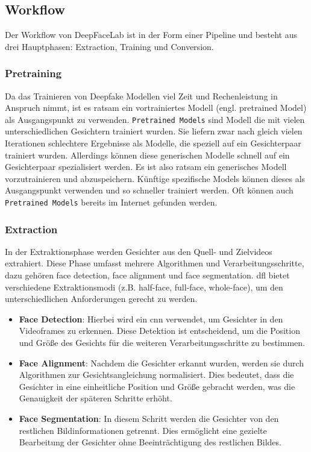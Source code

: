 \subsection{Workflow}\label{subsec:workflow}
Der Workflow von DeepFaceLab ist in der Form einer Pipeline und besteht aus drei Hauptphasen: Extraction, Training und Conversion.

\subsubsection*{Pretraining}\label{subsubsec:pretraining}
Da das Trainieren von Deepfake Modellen viel Zeit und Rechenleistung in Anspruch nimmt, ist es ratsam ein vortrainiertes Modell (engl. pretrained Model) als Ausgangspunkt zu verwenden.
\texttt{Pretrained Models} sind Modell die mit vielen unterschiedlichen Gesichtern trainiert wurden.
Sie liefern zwar nach gleich vielen Iterationen schlechtere Ergebnisse als Modelle, die speziell auf ein Gesichterpaar trainiert wurden.
Allerdings können diese generischen Modelle schnell auf ein Gesichterpaar spezialisiert werden.
Es ist also ratsam ein generisches Modell vorzutrainieren und abzuspeichern.
Künftige spezifische Models können dieses als Ausgangspunkt verwenden und so schneller trainiert werden.
Oft können auch \texttt{Pretrained Models} bereits im Internet gefunden werden.

\subsubsection*{Extraction}
In der Extraktionsphase werden Gesichter aus den Quell- und Zielvideos extrahiert.
Diese Phase umfasst mehrere Algorithmen und Verarbeitungsschritte, dazu gehören face detection, face alignment und face segmentation.
\gls{dfl} bietet verschiedene Extraktionsmodi (z.B. half-face, full-face, whole-face), um den unterschiedlichen Anforderungen gerecht zu werden\cite{deepfacelabintegratedflexibleextensible, deepfacelab}.

\begin{itemize}
    \item \textbf{Face Detection}: Hierbei wird ein \gls{cnn} verwendet, um Gesichter in den Videoframes zu erkennen.
    Diese Detektion ist entscheidend, um die Position und Größe des Gesichts für die weiteren Verarbeitungsschritte zu bestimmen.
    \item \textbf{Face Alignment}: Nachdem die Gesichter erkannt wurden, werden sie durch Algorithmen zur Gesichtsangleichung normalisiert.
    Dies bedeutet, dass die Gesichter in eine einheitliche Position und Größe gebracht werden, was die Genauigkeit der späteren Schritte erhöht.
    \item \textbf{Face Segmentation}: In diesem Schritt werden die Gesichter von den restlichen Bildinformationen getrennt.
    Dies ermöglicht eine gezielte Bearbeitung der Gesichter ohne Beeinträchtigung des restlichen Bildes.
\end{itemize}

